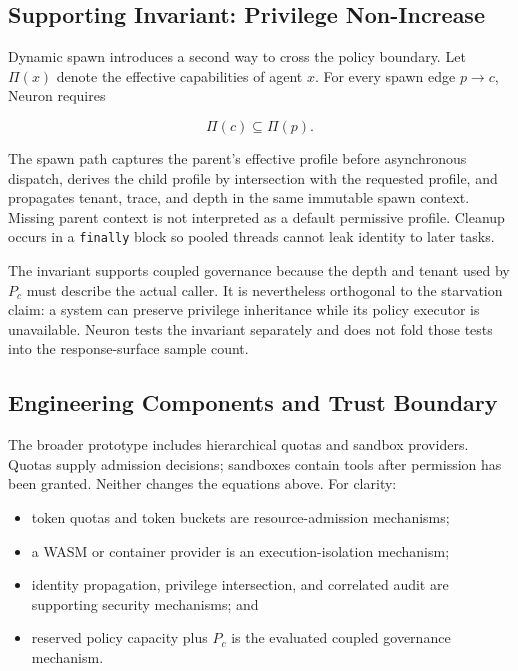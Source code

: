 \subsection{Supporting Invariant: Privilege Non-Increase}

Dynamic spawn introduces a second way to cross the policy boundary. Let
$\Pi(x)$ denote the effective capabilities of agent $x$. For every spawn edge
$p\rightarrow c$, Neuron requires

\begin{equation}
\Pi(c) \subseteq \Pi(p).
\end{equation}

The spawn path captures the parent's effective profile before asynchronous
dispatch, derives the child profile by intersection with the requested
profile, and propagates tenant, trace, and depth in the same immutable spawn
context. Missing parent context is not interpreted as a default permissive
profile. Cleanup occurs in a \texttt{finally} block so pooled threads cannot
leak identity to later tasks.

The invariant supports coupled governance because the depth and tenant used
by $P_c$ must describe the actual caller. It is nevertheless orthogonal to
the starvation claim: a system can preserve privilege inheritance while its
policy executor is unavailable. Neuron tests the invariant separately and
does not fold those tests into the response-surface sample count.

\subsection{Engineering Components and Trust Boundary}

The broader prototype includes hierarchical quotas and sandbox providers.
Quotas supply admission decisions; sandboxes contain tools after permission
has been granted. Neither changes the equations above. For clarity:

\begin{itemize}
  \item token quotas and token buckets are resource-admission mechanisms;
  \item a WASM or container provider is an execution-isolation mechanism;
  \item identity propagation, privilege intersection, and correlated audit
  are supporting security mechanisms; and
  \item reserved policy capacity plus $P_c$ is the evaluated coupled
  governance mechanism.
\end{itemize}

